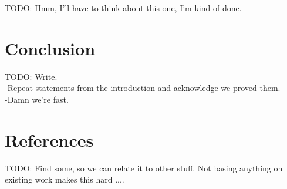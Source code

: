 \documentclass[a4paper,10pt]{article}
\begin{document}
TODO: Hmm, I'll have to think about this one, I'm kind of done.

\section{Conclusion}

TODO: Write.\\
-Repeat statements from the introduction and acknowledge we proved them.\\
-Damn we're fast.

\section{References}

TODO: Find some, so we can relate it to other stuff. Not basing anything on existing work makes this hard ....
\end{document}
